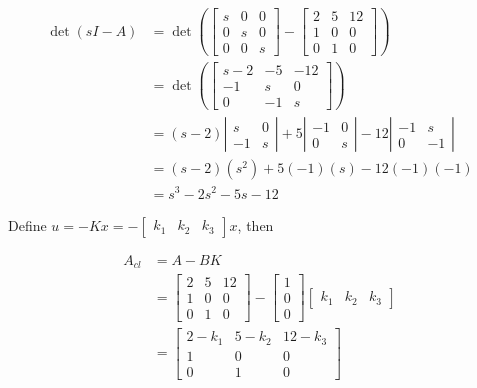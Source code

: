 \documentclass[main.tex]{subfiles}
\begin{document}
\begin{enumerate}
\begin{enumerate}
    $$
    \begin{aligned}
    \operatorname{det}(s I-A) &= \operatorname{det}\left(\left[\begin{array}{ccc}
    s & 0 & 0 \\
    0 & s & 0 \\
    0 & 0 & s
    \end{array}\right] - \left[\begin{array}{ccc}
    2 & 5 & 12 \\
    1 & 0 & 0 \\
    0 & 1 & 0
    \end{array}\right] \right)\\
    &= \operatorname{det}\left(\left[\begin{array}{ccc}
    s-2 & -5 & -12 \\
    -1 & s & 0 \\
    0 & -1 & s
    \end{array}\right] \right)\\
    & =(s-2)\left|\begin{array}{cc}
    s & 0 \\
    -1 & s
    \end{array}\right|+5\left|\begin{array}{cc}
    -1 & 0 \\
    0 & s
    \end{array}\right|-12 \left|\begin{array}{cc}
    -1 & s \\
    0 & -1
    \end{array}\right|\\
    & =(s-2)\left(s^2\right)+5(-1)(s)-12(-1)(-1) \\
    & =s^3-2 s^2-5 s - 12
    \end{aligned}
    $$
    
    Define $u= -K x = -\left[\begin{array}{lll}k_1 & k_2 & k_3 \end{array}\right] x$, then
    
    $$
    \begin{aligned}            
    A_{c l}&=A-B K\\
    &=\left[\begin{array}{ccc}
    2 & 5 & 12 \\
    1 & 0 & 0 \\
    0 & 1 & 0
    \end{array}\right]-\left[\begin{array}{l}
    1 \\
    0 \\
    0
    \end{array}\right]\left[\begin{array}{lll}
    k_1 & k_2 & k_3
    \end{array}\right]\\
    &=\left[\begin{array}{ccc}
    2-k_1 & 5-k_2 & 12-k_3 \\
    1 & 0 & 0 \\
    0 & 1 & 0
    \end{array}\right]
    \end{aligned}
    $$
    

\end{enumerate}
\end{enumerate}
\end{document}
